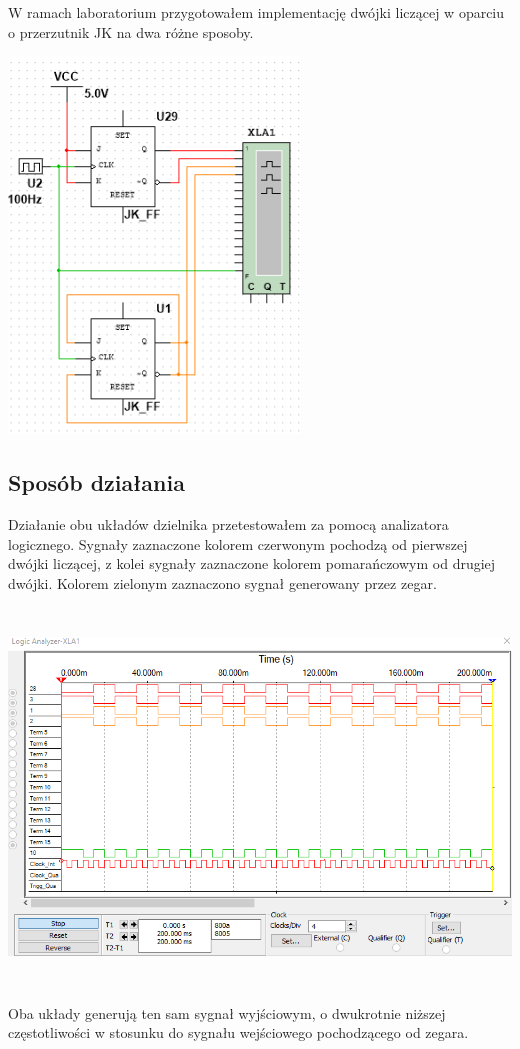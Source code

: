 \documentclass{article}
\begin{document}
            W ramach laboratorium przygotowałem implementację dwójki liczącej w oparciu o przerzutnik JK na dwa różne sposoby. 
            \begin{center}
                \includegraphics[height=10cm]{reports/img/Z3A_1.png}\\
            \end{center}
        
        \subsection{Sposób działania} 
            Działanie obu układów dzielnika przetestowałem za pomocą analizatora logicznego. Sygnały zaznaczone kolorem czerwonym pochodzą od pierwszej dwójki liczącej, z kolei sygnały zaznaczone kolorem pomarańczowym od drugiej dwójki. Kolorem zielonym zaznaczono sygnał generowany przez zegar. 
            \begin{center}
                \includegraphics[height=10cm]{reports/img/Z3A_2.png}\\
            \end{center}
            Oba układy generują ten sam sygnał wyjściowym, o dwukrotnie niższej częstotliwości w stosunku do sygnału wejściowego pochodzącego od zegara. 
            
\end{document}
